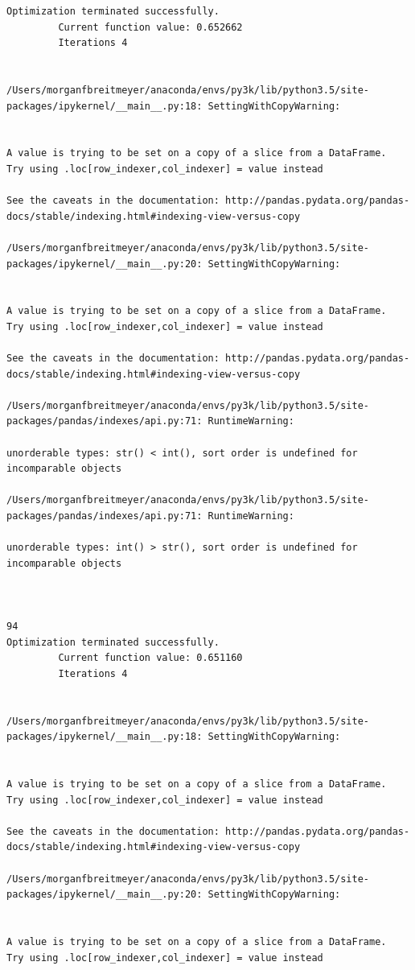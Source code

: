 \begin{lstlisting}
Optimization terminated successfully.
         Current function value: 0.652662
         Iterations 4


/Users/morganfbreitmeyer/anaconda/envs/py3k/lib/python3.5/site-packages/ipykernel/__main__.py:18: SettingWithCopyWarning:


A value is trying to be set on a copy of a slice from a DataFrame.
Try using .loc[row_indexer,col_indexer] = value instead

See the caveats in the documentation: http://pandas.pydata.org/pandas-docs/stable/indexing.html#indexing-view-versus-copy

/Users/morganfbreitmeyer/anaconda/envs/py3k/lib/python3.5/site-packages/ipykernel/__main__.py:20: SettingWithCopyWarning:


A value is trying to be set on a copy of a slice from a DataFrame.
Try using .loc[row_indexer,col_indexer] = value instead

See the caveats in the documentation: http://pandas.pydata.org/pandas-docs/stable/indexing.html#indexing-view-versus-copy

/Users/morganfbreitmeyer/anaconda/envs/py3k/lib/python3.5/site-packages/pandas/indexes/api.py:71: RuntimeWarning:

unorderable types: str() < int(), sort order is undefined for incomparable objects

/Users/morganfbreitmeyer/anaconda/envs/py3k/lib/python3.5/site-packages/pandas/indexes/api.py:71: RuntimeWarning:

unorderable types: int() > str(), sort order is undefined for incomparable objects



94
Optimization terminated successfully.
         Current function value: 0.651160
         Iterations 4


/Users/morganfbreitmeyer/anaconda/envs/py3k/lib/python3.5/site-packages/ipykernel/__main__.py:18: SettingWithCopyWarning:


A value is trying to be set on a copy of a slice from a DataFrame.
Try using .loc[row_indexer,col_indexer] = value instead

See the caveats in the documentation: http://pandas.pydata.org/pandas-docs/stable/indexing.html#indexing-view-versus-copy

/Users/morganfbreitmeyer/anaconda/envs/py3k/lib/python3.5/site-packages/ipykernel/__main__.py:20: SettingWithCopyWarning:


A value is trying to be set on a copy of a slice from a DataFrame.
Try using .loc[row_indexer,col_indexer] = value instead


\end{lstlisting}
